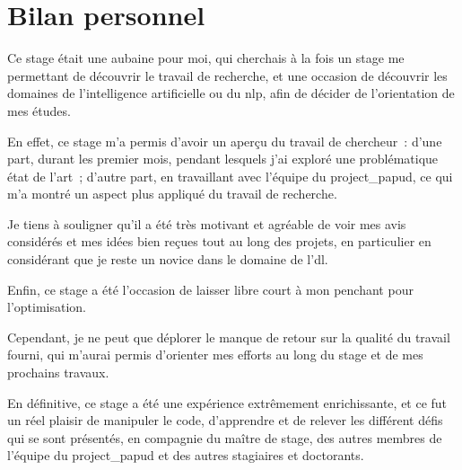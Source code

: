 \section{Bilan personnel}
Ce stage était une aubaine pour moi, qui cherchais à la fois un stage me permettant de découvrir le travail de recherche, et une occasion de découvrir les domaines de l'intelligence artificielle ou du \gls{nlp}, afin de décider de l'orientation de mes études.

En effet, ce stage m'a permis d'avoir un aperçu du travail de chercheur~:
d'une part, durant les premier mois, pendant lesquels j'ai exploré une problématique état de l'art~; d'autre part, en travaillant avec l'équipe du \gls{project_papud}, ce qui m'a montré un aspect plus appliqué du travail de recherche.

Je tiens à souligner qu'il a été très motivant et agréable de voir mes avis considérés et mes idées bien reçues tout au long des projets, en particulier en considérant que je reste un novice dans le domaine de l'\gls{dl}.

Enfin, ce stage a été l'occasion de laisser libre court à mon penchant pour l'optimisation.

Cependant, je ne peut que déplorer le manque de retour sur la qualité du travail fourni, qui m'aurai permis d'orienter mes efforts au long du stage et de mes prochains travaux.

En définitive, ce stage a été une expérience extrêmement enrichissante, et ce fut un réel plaisir de manipuler le code, d'apprendre et de relever les différent défis qui se sont présentés, en compagnie du maître de stage, des autres membres de l'équipe du \gls{project_papud} et des autres stagiaires et doctorants.










